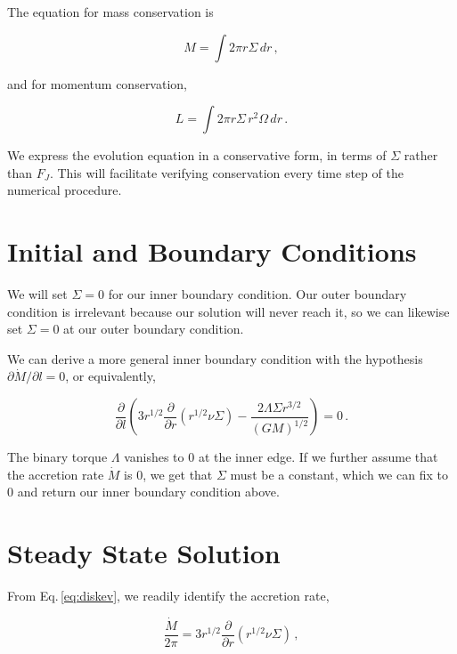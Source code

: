 \documentclass{article}
\begin{document}
The equation for mass conservation is

\begin{equation}
M = \int 2\pi r \Sigma\, dr\,,
\end{equation}

and for momentum conservation,

\begin{equation}
\textit{L} = \int2\pi r \Sigma\, r^2 \Omega\, dr\,.
\end{equation}

We express the evolution equation in a conservative form, in terms of $\Sigma$ rather than $F_J$. This will facilitate verifying conservation every time step of the numerical procedure.

\section{Initial and Boundary Conditions}

We will set $\Sigma = 0$ for our inner boundary condition. Our outer boundary condition is irrelevant because our solution will never reach it, so we can likewise set $\Sigma = 0$ at our outer boundary condition. 

We can derive a more general inner boundary condition with the hypothesis $\partial \dot{M}/ \partial l = 0$, or equivalently,

\begin{equation}
\frac{\partial}{\partial l} \left(3 r^{1/2} \frac{\partial}{\partial r} \left(r^{1/2} \nu \Sigma\right) - \frac{2 \Lambda \Sigma r^{3/2}}{(G M)^{1/2}}\right)= 0\,.
\end{equation}

The binary torque $\Lambda$ vanishes to 0 at the inner edge. If we further assume that the accretion rate $\dot{M}$ is 0, we get that $\Sigma$ must be a constant, which we can fix to 0 and return our inner boundary condition above.

\section{Steady State Solution}

From Eq.\,\ref{eq:diskev}, we readily identify the accretion rate,

\begin{equation}
\frac{\dot{M}}{2\pi} = 3 r^{1/2} \frac{\partial}{\partial r} \left(r^{1/2} \nu \Sigma\right)\,,
\end{equation}
\end{document}
